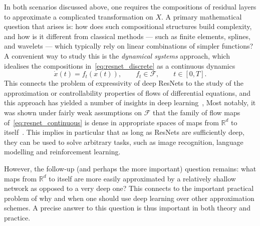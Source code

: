\documentclass[12pt]{amsart}
\numberwithin{equation}{section}
\theoremstyle{remark}
\begin{document}
In both scenarios discussed above, one requires the compositions of residual layers
to approximate a complicated transformation on $X$.
A primary mathematical question that arises is: how does such compositional structures
build complexity, and how is it different from classical methods --- such as finite elements, splines, and wavelets --- which typically
rely on linear combinations of simpler functions?
A convenient way to study this is the \emph{dynamical systems} approach,
which idealises the compositions in~\eqref{eq:resnet_discrete} as a continuous dynamics
\begin{equation}\label{eq:resnet_continuous}
    \dot{x}(t) = f_t(x(t)), \qquad f_t \in \mathcal{F}, \qquad t\in[0,T].
\end{equation}
This connects the problem of expressivity of deep ResNets to the study
of the approximation or controllability properties of flows of differential equations,
and this approach has yielded a number of insights in deep
learning~\cite{li2022deep,tabuada2022universal,agrachev2022control, ruiz2023neural, cheng2025interpolation},
Most notably, it was shown under fairly weak assumptions on $\mathcal{F}$ that
the family of flow maps of~\eqref{eq:resnet_continuous} is dense in appropriate
spaces of maps from $\mathbb{R}^d$ to itself~\cite{li2022deep,cheng2025interpolation}.
This implies in particular that as long as ResNets are sufficiently deep,
they can be used to solve arbitrary tasks, such as image recognition,
language modelling and reinforcement learning.

However, the follow-up (and perhaps the more important) question remains:
what maps from $\mathbb{R}^d$ to itself are more easily approximated by a
relatively shallow network as opposed to a very deep one?
This connects to the important practical problem of why and when
one should use deep learning over other approximation schemes.
A precise answer to this question is thus important in both theory and practice.
\end{document}
